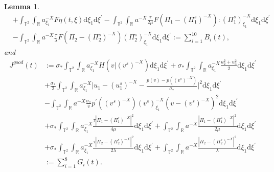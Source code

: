 \documentclass[10pt,reqno]{amsart}
\numberwithin{equation}{section}
\newtheorem{lemma}[theorem]{Lemma}
\newcommand{\dif}{\mathrm{d}}
\begin{document}
\begin{lemma}
\begin{align*}
&+\int_{\mathbb{T}^2}\int_{\mathbb{R}}a^{-X}_{\xi_1}F\eta(t,\xi)\dif \xi_1\dif \xi^{\prime}
-\int_{\mathbb{T}^2}\int_{\mathbb{R}}a^{-X}\frac{\tau}{2\mu}F\left(\Pi_1-(\Pi_1^s)^{-X}\right) : (\Pi_1^s)^{-X}_{\xi_1}\dif \xi_1\dif \xi^{\prime}\\
&-\int_{\mathbb{T}^2}\int_{\mathbb{R}}a^{-X}\frac{\tau}{\lambda}F\left(\Pi_2-(\Pi_2^s)^{-X}\right)
(\Pi_2^s)^{-X}_{\xi_1}\dif \xi_1\dif \xi^{\prime}
:=\sum\limits_{i=1}^{10}B_i(t),
\end{align*}
and
\begin{align*}
J^{good}(t)&:=\sigma_\ast\int_{\mathbb{T}^2}\int_{\mathbb{R}}a^{-X}_{\xi_1} H(v|(v^s)^{-X})\dif \xi_1\dif \xi^{\prime}
+\sigma_\ast\int_{\mathbb{T}^2}\int_{\mathbb{R}}a^{-X}_{\xi_1} \frac{u_2^2+u_3^2}{2}\dif \xi_1\dif \xi^{\prime}\\
&+\frac{\sigma_\ast}{2}\int_{\mathbb{T}^2}\int_{\mathbb{R}}a^{-X}_{\xi_1}
\Big|u_1-(u_1^s)^{-X}-\frac{p(v)-p((v^s)^{-X})}{\sigma_\ast}\Big|^2\dif \xi_1\dif \xi^{\prime}\\
&-\int_{\mathbb{T}^2}\int_{\mathbb{R}}a^{-X}\frac{\sigma_\ast}{v}p^{\prime}((v^s)^{-X})(v^s)^{-X}_{\xi_1}(v-(v^s)^{-X})^2\dif \xi_1\dif \xi^{\prime}\\
&+\sigma_\ast\int_{\mathbb{T}^2}\int_{\mathbb{R}}a^{-X}_{\xi_1} \frac{\tau|\Pi_1-(\Pi_1^s)^{-X}|^2}{4\mu}\dif \xi_1\dif \xi^{\prime}
+\int_{\mathbb{T}^2}\int_{\mathbb{R}}a^{-X}\frac{|\Pi_1-(\Pi_1^s)^{-X}|^2}{2\mu}\dif \xi_1\dif \xi^{\prime}\\
&+\sigma_\ast\int_{\mathbb{T}^2}\int_{\mathbb{R}}a^{-X}_{\xi_1} \frac{\tau|\Pi_2-(\Pi_2^s)^{-X}|^2}{2\lambda}\dif \xi_1\dif \xi^{\prime}
+\int_{\mathbb{T}^2}\int_{\mathbb{R}}a^{-X}\frac{|\Pi_2-(\Pi_2^s)^{-X}|^2}{\lambda}\dif \xi_1\dif \xi^{\prime}\\
&:=\sum\limits_{i=1}^{8}G_i(t).
\end{align*}
\end{lemma}
\end{document}

